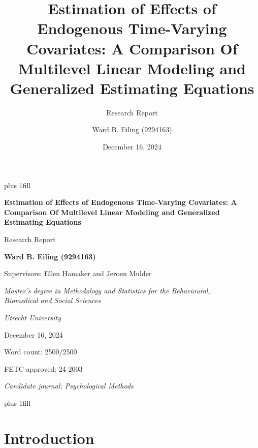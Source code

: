 \documentclass[
  11pt,
  a4paper,
]{article}
\title{Estimation of Effects of Endogenous Time-Varying Covariates: A
Comparison Of Multilevel Linear Modeling and Generalized Estimating
Equations}
\subtitle{Research Report}
\author{Ward B. Eiling (9294163)}
\date{December 16, 2024}
\begin{document}
\cleardoublepage
\thispagestyle{empty}
{\centering
\hbox{}\vskip 0cm plus 1fill
{\Large\bfseries Estimation of Effects of Endogenous Time-Varying
Covariates: A Comparison Of Multilevel Linear Modeling and Generalized
Estimating Equations \par}
\vspace{3ex}
{\large Research Report \par}
\vspace{9ex}
{\large\bfseries Ward B. Eiling (9294163) \par}
\vspace{3ex}
{\large Supervisors: Ellen Hamaker and Jeroen Mulder \par}
\vspace{9ex}
{\normalsize \textit{Master's degree in Methodology and Statistics for the Behavioural, \\ Biomedical and Social Sciences} \par}
\vspace{3ex}
{\normalsize \textit{Utrecht University} \par}
\vspace{9ex}
{\normalsize December 16, 2024 \par}
\vspace{3ex}
{\normalsize Word count: 2500/2500 \par}
\vspace{9ex}
{\normalsize FETC-approved: 24-2003 \par}
\vspace{9ex}
{\normalsize \textit{Candidate journal: Psychological Methods} \par}
\hbox{}\vskip 0cm plus 1fill
}


\newpage

\section{Introduction}\label{introduction}
\end{document}
